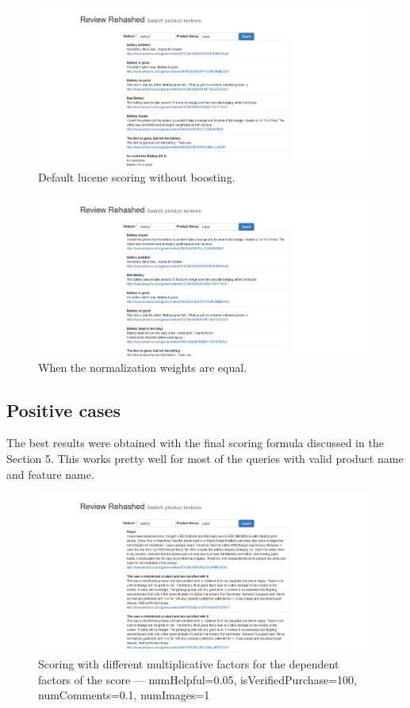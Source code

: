 \documentclass{article}
\begin{document}
\begin{figure}[ht!]
  \centering
  \includegraphics[width=1\textwidth]{noboosting}
  \caption{Default lucene scoring without boosting.~\label{fig:noboosting}}
\end{figure}

\begin{figure}[ht!]
  \centering
  \includegraphics[width=1\textwidth]{equal_weights}
  \caption{When the normalization weights are equal.~\label{fig:equal_weights}}
\end{figure}

\subsection{Positive cases}
The best results were obtained with the final scoring formula discussed in the Section 5. This works pretty well for most of the queries with valid product name and feature name.
\begin{figure}[ht!]
  \centering
  \includegraphics[width=1\textwidth]{scoring_piecewise_normalization}
  \caption{Scoring with different multiplicative factors for the dependent factors of the score --- numHelpful=0.05, isVerifiedPurchase=100, numComments=0.1, numImages=1~\label{fig:Search_Engine}}
\end{figure}
\end{document}
